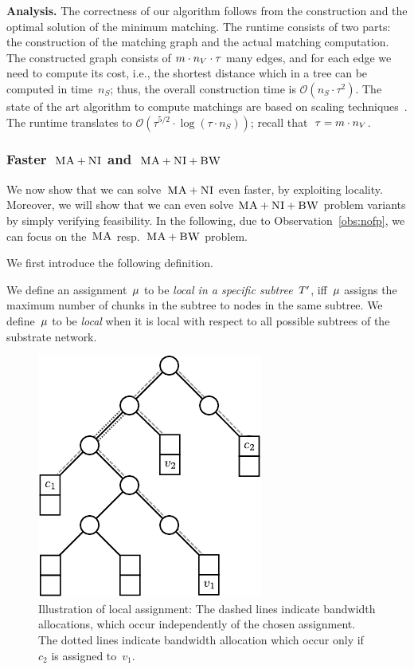 \textbf{Analysis.}
The correctness of our algorithm follows from the construction and the optimal
solution of the minimum matching.
The runtime consists of two parts: the construction of the matching graph and
the actual matching computation. The constructed graph consists of
$m \cdot n_V \cdot \tau$
many edges,
and for each edge we need to compute its cost, i.e., the shortest distance
which in a tree can be computed in time~$n_S$; thus, the overall construction time
is
$\mathcal{O}(n_S \cdot \tau^2)$.
The state of the art algorithm to compute matchings are based on scaling techniques~\cite{scale-match}.
The runtime translates to
$\mathcal{O}(\tau^{5/2}\cdot \log(\tau\cdot n_S))$; recall that~$\tau = m\cdot n_V$.




\subsubsection{Faster~$\textsc{MA}+\textsc{NI}$ and~$\textsc{MA}+\textsc{NI}+\textsc{BW}$}

We now show that we can solve~$\textsc{MA}+\textsc{NI}$ even faster, by exploiting
locality. Moreover, we will show that we can
even solve
$\textsc{MA}+\textsc{NI}+\textsc{BW}$ problem variants by simply
verifying feasibility.
In the following, due to Observation~\ref{obs:nofp}, we can focus on
the~$\textsc{MA}$ resp.~$\textsc{MA}+\textsc{BW}$ problem.

We first introduce the following definition.
\begin{defn}\label{def:loc}
We define an assignment~$\mu$ to
be \emph{local in a specific subtree~$T'$}, iff~$\mu$
assigns the maximum number of chunks in the
subtree to nodes in the same subtree.
We define~$\mu$ to be \emph{local} when
it is local with respect to all possible subtrees of the substrate network.
\end{defn}

\begin{figure}
\center
\includegraphics[width = 0.45\columnwidth]{figs/static-mapping/unbalanced_tree}
\caption{Illustration of local assignment: The dashed lines indicate bandwidth allocations, which occur
independently of the chosen assignment. The dotted lines indicate bandwidth
allocation which occur only if~$c_2$ is assigned to~$v_1$.}
\label{fig:unbalanced_tree}
\end{figure}

